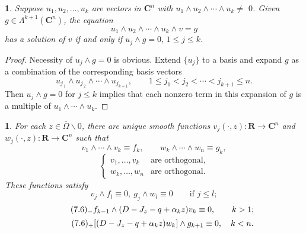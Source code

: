 \documentclass{surv-l}
\theoremstyle{plain}
\newtheorem{lemma}[theorem]{\sc{Lemma}}
\theoremstyle{definition}
\numberwithin{equation}{chapter}
\begin{document}
\begin{lemma}\label{chap01:lem7.1}
Suppose $u_{1}, u_{2},\ldots,u_{k}$ are vectors in $\mathbf{C}^{n}$ with $ u_{1}\wedge u_{2}\wedge\cdots\wedge u_{k}\neq$ $0$. Given $g\in\Lambda^{k+1}(\mathbf{C}^{n})$, the equation
\begin{equation*}
u_{1}\wedge u_{2}\wedge\cdots\wedge u_{k}\wedge v=g
\end{equation*}
has a solution of $v$ if and only if $u_{j}\wedge g=0,\, 1\leq j\leq k$.
\end{lemma}
\begin{proof}
Necessity of $u_{j}\wedge g=0$ is obvious. Extend $\{u_{j}\}$ to a basis and expand $g$ as a combination of the corresponding basis vectors
\begin{equation*}
u_{j_{\,1}}\wedge u_{j_{\,2}}\wedge\cdots\wedge u_{j_{k+1}},\qquad 1\leq j_{1}< j_{2}<\cdots<j_{k+1}\leq n.
\end{equation*}
Then $u_{j}\wedge g=0$ for $j\leq k$ implies that each nonzero term in this expansion of $g$ is a multiple of $ u_{1}\wedge\cdots\wedge u_{k}$.
\end{proof}
\begin{lemma}\label{chap01:lem7.2}
For each $z\in\overline{\Omega}\backslash 0$, there are unique smooth functions $v_{j}(\cdot, z) : \mathbf{R}\rightarrow \mathbf{C}^{n}$ and $w_{j}(\cdot,z) : \mathbf{R}\rightarrow \mathbf{C}^{n}$ such that
\setcounter{equation}{2}
\begin{equation}\label{eq7.3}
v_{1}\wedge\cdots\wedge v_{k}\equiv f_{k},\qquad  w_{k}\wedge\cdots\wedge w_{n}\equiv g_{k},
\end{equation}
\begin{equation}\label{eq7.4}
\left\{\begin{array}{ll}
v_{1},\ldots, v_{k} & \text{are orthogonal},\\
w_{k},\ldots, w_{n} & \text{are orthogonal}.
\end{array}\right.
\end{equation}
These functions satisfy
\begin{equation}\label{eq7.5}
v_{j}\wedge f_{l}\equiv 0,\ g_{j}\wedge w_{l}\equiv 0\qquad \text{if } j\leq l;
\end{equation}
\begin{equation*}
\tag*{$(7.6)_{-}$}   f_{k-1}\wedge(D-J_{z}-q+\alpha_{k}z)v_{k}\equiv 0,\qquad k>1;
\end{equation*}
\begin{equation*}
\tag*{$(7.6)_{+}$} [(D-J_{z}-q+\alpha_{k}z)w_{k}]\wedge g_{k+1}\equiv 0,\quad k<n.
\end{equation*}
\end{lemma}
\end{document}
